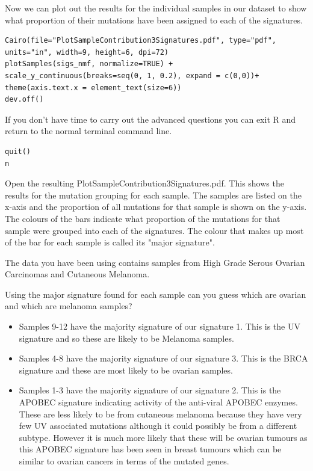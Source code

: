 \begin{steps}
Now we can plot out the results for the individual samples in our dataset to show what proportion of their mutations have been assigned to each of the signatures.
\begin{lstlisting}
Cairo(file="PlotSampleContribution3Signatures.pdf", type="pdf", units="in", width=9, height=6, dpi=72)
plotSamples(sigs_nmf, normalize=TRUE) + scale_y_continuous(breaks=seq(0, 1, 0.2), expand = c(0,0))+ theme(axis.text.x = element_text(size=6))
dev.off()
\end{lstlisting}

If you don't have time to carry out the advanced questions you can
exit R and return to the normal terminal command line.
\begin{lstlisting}
quit()
n
\end{lstlisting}

Open the resulting PlotSampleContribution3Signatures.pdf.
\vspace{4 mm}
This shows the results for the mutation grouping for each sample.
The samples are listed on the x-axis and the proportion of all mutations for that sample is shown on the y-axis.
The colours of the bars indicate what proportion of the mutations for that sample were grouped into each of the signatures.
The colour that makes up most of the bar for each sample is called its "major signature".
\end{steps}

\begin{information}
The data you have been using contains samples from High Grade Serous Ovarian Carcinomas and Cutaneous Melanoma. 
\end{information}

\begin{questions}
Using the major signature found for each sample can you guess which are ovarian and which are melanoma samples?
\end{questions}

\begin{answer}
\begin{itemize}
\item Samples 9-12 have the majority signature of our signature 1. This is the UV signature and so these are likely to be Melanoma samples.
\item Samples 4-8 have the majority signature of our signature 3. This is the BRCA signature and these are most likely to be ovarian samples.
\item Samples 1-3 have the majority signature of our signature 2. This is the APOBEC signature indicating activity of the anti-viral APOBEC enzymes. These are less likely to be from cutaneous melanoma because they have very few UV associated mutations although it could possibly be from a different subtype. However it is much more likely that these will be ovarian tumours as this APOBEC signature has been seen in breast tumours which can be similar to ovarian cancers in terms of the mutated genes.
\end{itemize}
\end{answer}

